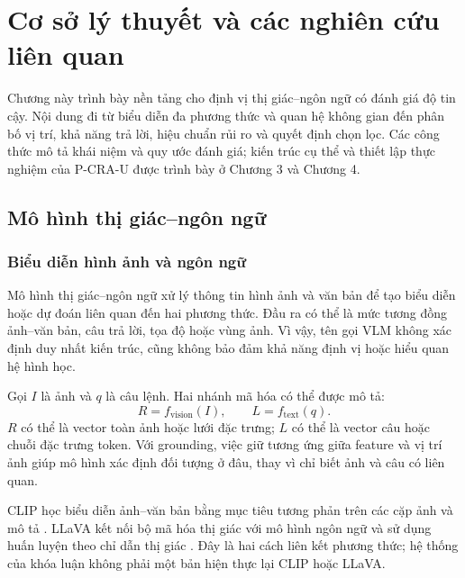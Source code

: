 \chapter{Cơ sở lý thuyết và các nghiên cứu liên quan}
\label{sec:related}


Chương này trình bày nền tảng cho định vị thị giác--ngôn ngữ có đánh giá độ tin cậy. Nội dung đi từ biểu diễn đa phương thức và quan hệ không gian đến phân bố vị trí, khả năng trả lời, hiệu chuẩn rủi ro và quyết định chọn lọc. Các công thức mô tả khái niệm và quy ước đánh giá; kiến trúc cụ thể và thiết lập thực nghiệm của P-CRA-U được trình bày ở Chương 3 và Chương 4.

\section{Mô hình thị giác--ngôn ngữ}
\label{sec:theory-vlm}

\subsection{Biểu diễn hình ảnh và ngôn ngữ}

Mô hình thị giác--ngôn ngữ xử lý thông tin hình ảnh và văn bản để tạo biểu diễn hoặc dự đoán liên quan đến hai phương thức. Đầu ra có thể là mức tương đồng ảnh--văn bản, câu trả lời, tọa độ hoặc vùng ảnh. Vì vậy, tên gọi VLM không xác định duy nhất kiến trúc, cũng không bảo đảm khả năng định vị hoặc hiểu quan hệ hình học.

Gọi $I$ là ảnh và $q$ là câu lệnh. Hai nhánh mã hóa có thể được mô tả:
\begin{equation}
    R=f_{\mathrm{vision}}(I),\qquad L=f_{\mathrm{text}}(q).
    \label{eq:theory-image-text}
\end{equation}
$R$ có thể là vector toàn ảnh hoặc lưới đặc trưng; $L$ có thể là vector câu hoặc chuỗi đặc trưng token. Với grounding, việc giữ tương ứng giữa feature và vị trí ảnh giúp mô hình xác định đối tượng ở đâu, thay vì chỉ biết ảnh và câu có liên quan.

CLIP học biểu diễn ảnh--văn bản bằng mục tiêu tương phản trên các cặp ảnh và mô tả \cite{radford2021clip}. LLaVA kết nối bộ mã hóa thị giác với mô hình ngôn ngữ và sử dụng huấn luyện theo chỉ dẫn thị giác \cite{liu2023llava}. Đây là hai cách liên kết phương thức; hệ thống của khóa luận không phải một bản hiện thực lại CLIP hoặc LLaVA.

